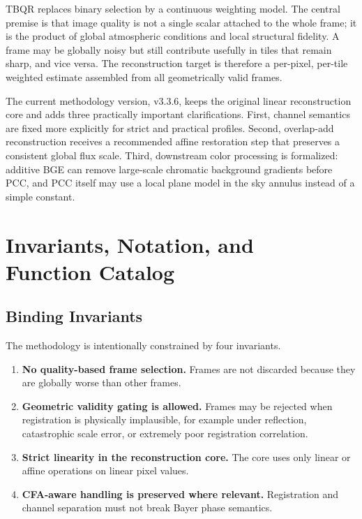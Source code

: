 \documentclass[10pt,twocolumn]{article}
\begin{document}
TBQR replaces binary selection by a continuous weighting model. The central premise is that image quality is not a single scalar attached to the whole frame; it is the product of global atmospheric conditions and local structural fidelity. A frame may be globally noisy but still contribute usefully in tiles that remain sharp, and vice versa. The reconstruction target is therefore a per-pixel, per-tile weighted estimate assembled from all geometrically valid frames.

The current methodology version, v3.3.6, keeps the original linear reconstruction core and adds three practically important clarifications. First, channel semantics are fixed more explicitly for strict and practical profiles. Second, overlap-add reconstruction receives a recommended affine restoration step that preserves a consistent global flux scale. Third, downstream color processing is formalized: additive BGE can remove large-scale chromatic background gradients before PCC, and PCC itself may use a local plane model in the sky annulus instead of a simple constant.

\section{Invariants, Notation, and \protect \\Function Catalog}

\subsection{Binding Invariants}

The methodology is intentionally constrained by four invariants.
\begin{enumerate}
  \item \textbf{No quality-based frame selection.} Frames are not discarded because they are globally worse than other frames.
  \item \textbf{Geometric validity gating is allowed.} Frames may be rejected when registration is physically implausible, for example under reflection, catastrophic scale error, or extremely poor registration correlation.
  \item \textbf{Strict linearity in the reconstruction core.} The core uses only linear or affine operations on linear pixel values.
  \item \textbf{CFA-aware handling is preserved where relevant.} Registration and channel separation must not break Bayer phase semantics.
\end{enumerate}
\end{document}
